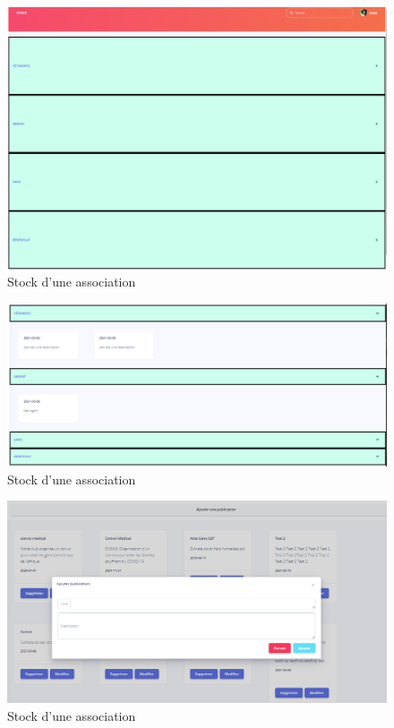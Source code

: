\begin{figure}[!h]
\begin{center}
\includegraphics[width=17cm]{stock.png}
\caption{Stock d'une association}
\end{center}
\end{figure}

\begin{figure}[!h]
\begin{center}
\includegraphics[width=17cm]{stock2.png}
\caption{Stock d'une association}
\end{center}
\end{figure}


\begin{figure}[!h]
\begin{center}
\includegraphics[width=17cm]{ajout Pub.png}
\caption{Stock d'une association}
\end{center}
\end{figure}